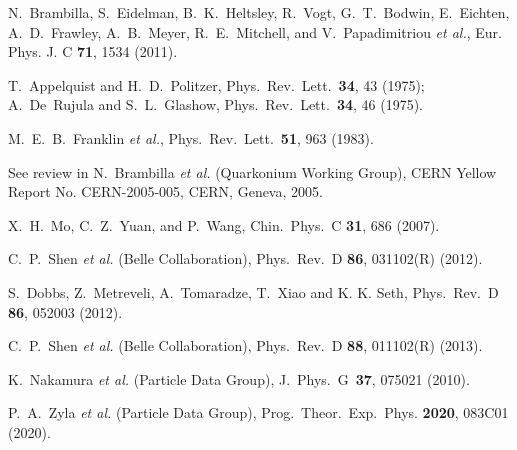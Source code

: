 \documentclass[%
preprint,
 amsmath,amssymb,
 aps,
]{revtex4-2}
\newcommand{\EE}{e^+e^-}
\newcommand{\upsi}{\Upsilon(1S)}
\newcommand{\upsip}{\Upsilon(2S)}
\begin{document}
\begin{thebibliography}{**}

N.~Brambilla, S.~Eidelman, B.~K.~Heltsley, R.~Vogt, G.~T.~Bodwin, E.~Eichten, A.~D.~Frawley, A.~B.~Meyer, R.~E.~Mitchell, and V.~Papadimitriou \textit{et al.},
Eur. Phys. J. C \textbf{71}, 1534 (2011).


T.~Appelquist and H.~D.~Politzer, 
Phys.\ Rev.\ Lett.\ {\bf 34}, 43 (1975);
A.~De~Rujula and S.~L.~Glashow, 
Phys.\ Rev.\ Lett.\ {\bf 34}, 46 (1975).

M.~E.~B.~Franklin {\it et al.},
Phys.\ Rev.\ Lett.\ {\bf 51}, 963 (1983). 

See review in N.~Brambilla \textit{et al.} (Quarkonium Working Group),
CERN Yellow Report No. CERN-2005-005, CERN, Geneva, 2005.

X.~H.~Mo, C.~Z.~Yuan, and P.~Wang, 
Chin.\ Phys.\ C {\bf 31}, 686 (2007).

C.~P.~Shen {\it et al.} (Belle Collaboration),
Phys.\ Rev.\ D {\bf 86}, 031102(R) (2012).

S.~Dobbs, Z.~Metreveli, A.~Tomaradze, T.~Xiao and K. K. Seth,
Phys.\ Rev.\ D {\bf 86}, 052003 (2012).

C.~P.~Shen {\it et al.} (Belle Collaboration),
Phys.\ Rev.\ D {\bf 88}, 011102(R) (2013).

K.~Nakamura {\it et al.} (Particle Data Group), 
J.\ Phys.\ G\ {\bf 37}, 075021 (2010). 

P.~A.~Zyla {\it et al.} (Particle Data Group), 
Prog.\ Theor.\ Exp.\ Phys. {\bf 2020}, 083C01 (2020). 


\end{thebibliography}
\end{document}
